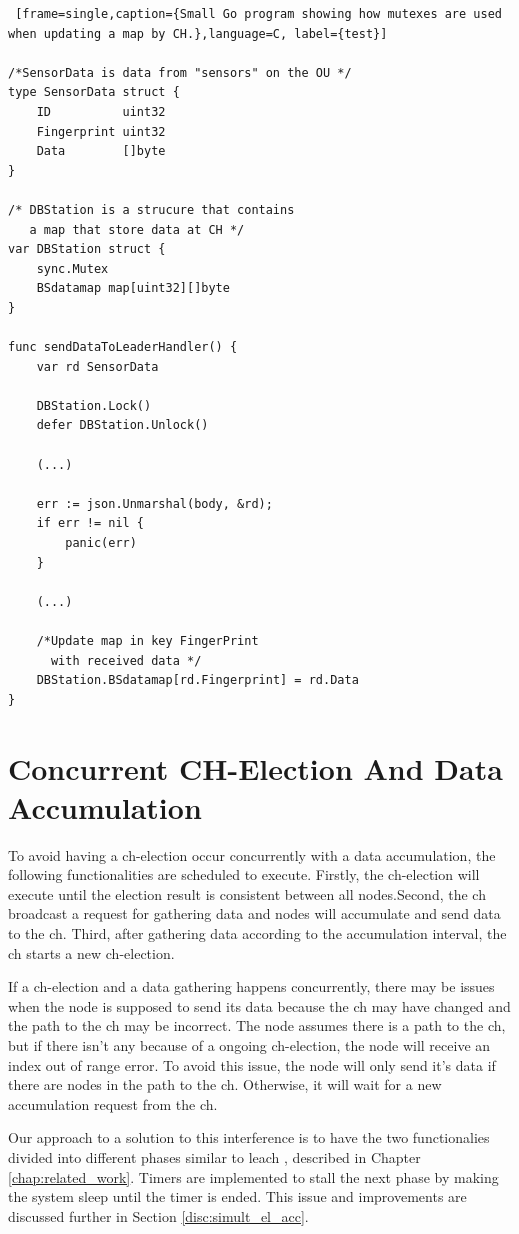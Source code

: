 \documentclass[USenglish]{uit-thesis}
\begin{document}
\begin{lstlisting} [frame=single,caption={Small Go program showing how mutexes are used when updating a map by CH.},language=C, label={test}]

/*SensorData is data from "sensors" on the OU */
type SensorData struct {
	ID          uint32
	Fingerprint uint32
	Data        []byte
}

/* DBStation is a strucure that contains 
   a map that store data at CH */
var DBStation struct {
	sync.Mutex
	BSdatamap map[uint32][]byte
}

func sendDataToLeaderHandler() {
	var rd SensorData
	
	DBStation.Lock()
	defer DBStation.Unlock()
	
	(...)
	
	err := json.Unmarshal(body, &rd); 
	if err != nil {
		panic(err)
	}
	
	(...)
	
	/*Update map in key FingerPrint
	  with received data */
	DBStation.BSdatamap[rd.Fingerprint] = rd.Data
}
\end{lstlisting}


\newpage

\section{Concurrent CH-Election And Data Accumulation} \label{sec:conc_events}
To avoid having a \gls{ch}-election occur concurrently with a data accumulation, the following functionalities are scheduled to execute.
Firstly, the \gls{ch}-election will execute until the election result is consistent between all nodes.Second, the \gls{ch} broadcast a request for gathering data and nodes will accumulate and send data to the \gls{ch}. Third, after gathering data according to the accumulation interval, the \gls{ch} starts a new \gls{ch}-election. 

If a \gls{ch}-election and a data gathering happens concurrently, there may be issues when the node is supposed to send its data because the \gls{ch} may have changed and the path to the \gls{ch} may be incorrect. The node assumes there is a path to the \gls{ch}, but if there isn't any because of a ongoing \gls{ch}-election, the node will receive an index out of range error. To avoid this issue, the node will only send it's data if there are nodes in the path to the \gls{ch}. Otherwise, it will wait for a new accumulation request from the \gls{ch}.

Our approach to a solution to this interference is to have the two functionalies divided into different phases similar to \gls{leach} \cite{leach}, described in Chapter \ref{chap:related_work}. Timers are implemented to stall the next phase by making the system sleep until the timer is ended. This issue and improvements are discussed further in Section \ref{disc:simult_el_acc}.
\end{document}

